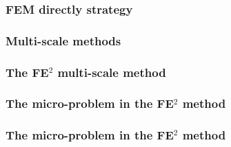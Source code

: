 \documentclass[usenames,dvipsnames]{beamer}
\begin{document}
\begin{frame}
\frametitle{FEM directly strategy}
\begin{figure}[!ht]
\resizebox{1.0\linewidth}{!}{}
\end{figure}
\end{frame}


\begin{frame}
\frametitle{Multi-scale methods}
\begin{figure}[!ht]
\resizebox{1.0\linewidth}{!}{}
\end{figure}
\end{frame}


\begin{frame}
\frametitle{The FE$^2$ multi-scale method}
\begin{figure}[!ht]
\resizebox{1.0\linewidth}{!}{}
\end{figure}
\end{frame}


\begin{frame}
\frametitle{The micro-problem in the FE$^2$ method}
\begin{figure}[!ht]
\resizebox{0.8\linewidth}{!}{}
\end{figure}
\end{frame}




\begin{frame}
\frametitle{The micro-problem in the FE$^2$ method}
\begin{figure}[!ht]
\resizebox{0.8\linewidth}{!}{}
\end{figure}
\end{frame}
\end{document}
